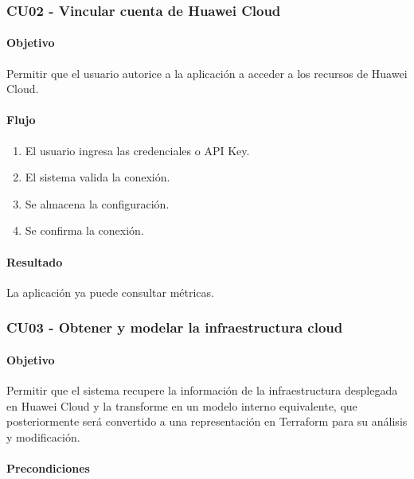 \subsubsection{CU02 - Vincular cuenta de Huawei Cloud}

\paragraph*{Objetivo}

Permitir que el usuario autorice a la aplicación a acceder a los recursos de Huawei Cloud.

\paragraph*{Flujo}

\begin{enumerate}
\item El usuario ingresa las credenciales o API Key.
\item El sistema valida la conexión.
\item Se almacena la configuración.
\item Se confirma la conexión.
\end{enumerate}

\paragraph*{Resultado}

La aplicación ya puede consultar métricas.

\subsubsection{CU03 - Obtener y modelar la infraestructura cloud}

\paragraph*{Objetivo}

Permitir que el sistema recupere la información de la infraestructura desplegada en Huawei Cloud y la transforme en un modelo interno equivalente, que posteriormente será convertido a una representación en Terraform para su análisis y modificación.

\paragraph*{Precondiciones}

